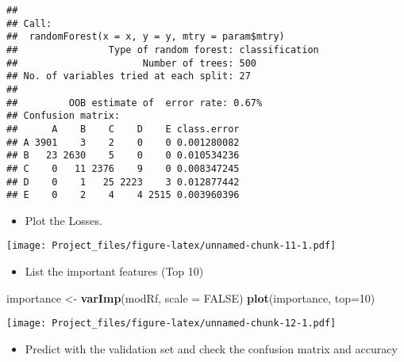 \documentclass[
]{article}
\newenvironment{Shaded}{\begin{snugshade}}{\end{snugshade}}
\newcommand{\AttributeTok}[1]{\textcolor[rgb]{0.13,0.29,0.53}{#1}}
\newcommand{\ConstantTok}[1]{\textcolor[rgb]{0.56,0.35,0.01}{#1}}
\newcommand{\DecValTok}[1]{\textcolor[rgb]{0.00,0.00,0.81}{#1}}
\newcommand{\FunctionTok}[1]{\textcolor[rgb]{0.13,0.29,0.53}{\textbf{#1}}}
\newcommand{\NormalTok}[1]{#1}
\newcommand{\OtherTok}[1]{\textcolor[rgb]{0.56,0.35,0.01}{#1}}
\newcommand{\SpecialCharTok}[1]{\textcolor[rgb]{0.81,0.36,0.00}{\textbf{#1}}}
\providecommand{\tightlist}{%
  \setlength{\itemsep}{0pt}\setlength{\parskip}{0pt}}
\begin{document}
\begin{verbatim}
## 
## Call:
##  randomForest(x = x, y = y, mtry = param$mtry) 
##                Type of random forest: classification
##                      Number of trees: 500
## No. of variables tried at each split: 27
## 
##         OOB estimate of  error rate: 0.67%
## Confusion matrix:
##      A    B    C    D    E class.error
## A 3901    3    2    0    0 0.001280082
## B   23 2630    5    0    0 0.010534236
## C    0   11 2376    9    0 0.008347245
## D    0    1   25 2223    3 0.012877442
## E    0    2    4    4 2515 0.003960396
\end{verbatim}

\begin{itemize}
\tightlist
\item
  Plot the Losses.
\end{itemize}

\begin{Shaded}
\end{Shaded}

\texttt{[image: Project\_files/figure-latex/unnamed-chunk-11-1.pdf]}

\begin{itemize}
\tightlist
\item
  List the important features (Top 10)
\end{itemize}

\begin{Shaded}
\begin{Highlighting}[]
\NormalTok{importance }\OtherTok{\textless{}{-}} \FunctionTok{varImp}\NormalTok{(modRf, }\AttributeTok{scale =} \ConstantTok{FALSE}\NormalTok{)}
\FunctionTok{plot}\NormalTok{(importance, }\AttributeTok{top=}\DecValTok{10}\NormalTok{)}
\end{Highlighting}
\end{Shaded}

\texttt{[image: Project\_files/figure-latex/unnamed-chunk-12-1.pdf]}

\begin{itemize}
\tightlist
\item
  Predict with the validation set and check the confusion matrix and
  accuracy
\end{itemize}
\end{document}

